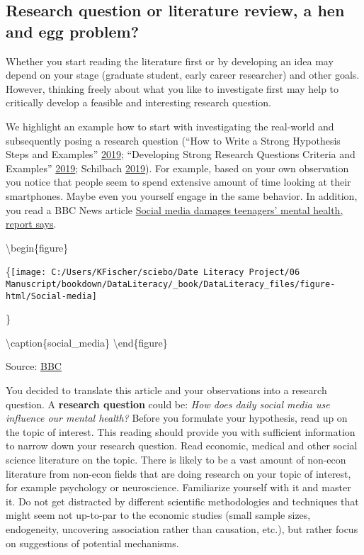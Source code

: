 \documentclass[
]{book}
\begin{document}
\hypertarget{research-question-or-literature-review-a-hen-and-egg-problem}{%
\subsection{Research question or literature review, a hen and egg
problem?}\label{research-question-or-literature-review-a-hen-and-egg-problem}}

Whether you start reading the literature first or by developing an idea
may depend on your stage (graduate student, early career researcher) and
other goals. However, thinking freely about what you like to investigate
first may help to critically develop a feasible and interesting research
question.

We highlight an example how to start with investigating the real-world
and subsequently posing a research question (``How to Write a Strong
Hypothesis Steps and Examples''
\protect\hyperlink{ref-noauthor_how_2019}{2019}; ``Developing Strong
Research Questions Criteria and Examples''
\protect\hyperlink{ref-noauthor_developing_2019}{2019}; Schilbach
\protect\hyperlink{ref-schilbach_5_2019}{2019}). For example, based on
your own observation you notice that people seem to spend extensive
amount of time looking at their smartphones. Maybe even you yourself
engage in the same behavior. In addition, you read a BBC News article
\href{https://www.bbc.com/news/technology-55826238}{Social media damages
teenagers' mental health, report says}.

\textbackslash begin\{figure\}

\{\centering \texttt{[image: C:/Users/KFischer/sciebo/Date Literacy Project/06 Manuscript/bookdown/DataLiteracy/\_book/DataLiteracy\_files/figure-html/Social-media]}

\}

\textbackslash caption\{social\_media\}\label{fig:unnamed-chunk-4}
\textbackslash end\{figure\}

Source: \href{https://www.bbc.com/news/technology-55826238}{BBC}

You decided to translate this article and your observations into a
research question. A \textbf{research question} could be: \emph{How does
daily social media use influence our mental health?} Before you
formulate your hypothesis, read up on the topic of interest. This
reading should provide you with sufficient information to narrow down
your research question. Read economic, medical and other social science
literature on the topic. There is likely to be a vast amount of non-econ
literature from non-econ fields that are doing research on your topic of
interest, for example psychology or neuroscience. Familiarize yourself
with it and master it. Do not get distracted by different scientific
methodologies and techniques that might seem not up-to-par to the
economic studies (small sample sizes, endogeneity, uncovering
association rather than causation, etc.), but rather focus on
suggestions of potential mechanisms.
\end{document}
